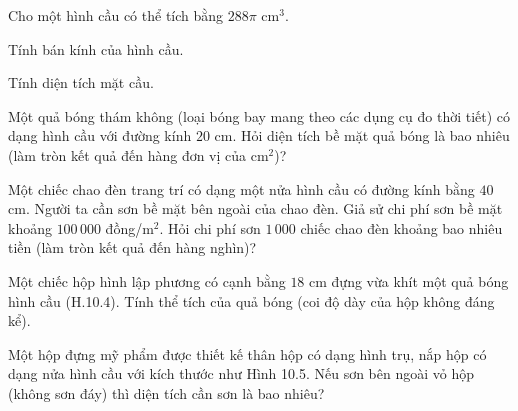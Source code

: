 \begin{practice}
\begin{questions}[resume=SBT]
        \item Cho một hình cầu có thể tích bằng $288\pi$ cm$^3$.
        \begin{questions}
            \item Tính bán kính của hình cầu.

            \answerline
            \answerline
            \item Tính diện tích mặt cầu.

            \answerline
            \answerline
        \end{questions}

        \item Một quả bóng thám không (loại bóng bay mang theo các dụng cụ đo thời tiết) có dạng hình cầu với đường kính $20$ cm. Hỏi diện tích bề mặt quả bóng là bao nhiêu (làm tròn kết quả đến hàng đơn vị của cm$^2$)?

        \answerline
        \answerline

        \item Một chiếc chao đèn trang trí có dạng một nửa hình cầu có đường kính bằng $40$ cm. Người ta cần sơn bề mặt bên ngoài của chao đèn. Giả sử chi phí sơn bề mặt khoảng $100\,000$ đồng/m$^2$. Hỏi chi phí sơn $1\,000$ chiếc chao đèn khoảng bao nhiêu tiền (làm tròn kết quả đến hàng nghìn)?


        \answerline
        \answerline
        \answerline

        \item Một chiếc hộp hình lập phương có cạnh bằng $18$ cm đựng vừa khít một quả bóng hình cầu (H.10.4). Tính thể tích của quả bóng (coi độ dày của hộp không đáng kể).


        \answerline
        \answerline

        \item Một hộp đựng mỹ phẩm được thiết kế thân hộp có dạng hình trụ, nắp hộp có dạng nửa hình cầu với kích thước như Hình 10.5. Nếu sơn bên ngoài vỏ hộp (không sơn đáy) thì diện tích cần sơn là bao nhiêu?

        \begin{center}
\end{center}
\end{questions}
\end{practice}
